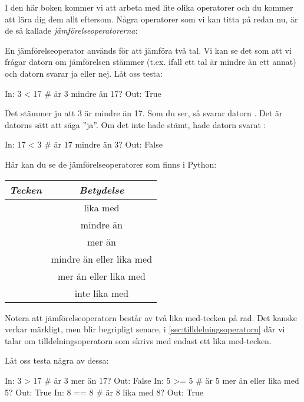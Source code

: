 I den här boken kommer vi att arbeta med lite olika operatorer och du kommer att lära dig dem allt eftersom. Några operatorer som vi kan titta på redan nu, är de så kallade \emph{jämförelseoperatorerna}:

En jämförelseoperator används för att jämföra två tal. Vi kan se det som att vi frågar datorn om jämförelsen stämmer (t.ex. ifall ett tal är mindre än ett annat) och datorn svarar ja eller nej. Låt oss testa:

\begin{python}[caption={Mindre än-operatorn},label={}]
In: 3 < 17 # är 3 mindre än 17?
Out: True
\end{python}

Det stämmer ju att 3 är mindre än 17. Som du ser, så svarar datorn . Det är datorns sätt att säga ''ja''. Om det inte hade stämt, hade datorn svarat :

\begin{python}[caption={Mindre än-operatorn igen},label={}]
In: 17 < 3 # är 17 mindre än 3?
Out: False
\end{python}
\newpage
Här kan du se de jämförelseoperatorer som finns i Python:
\begin{center}
 \label{tab:jamforelseoperatorer}
\begin{tabular}{ l | c }
  \hline
  \emph{Tecken} & \emph{Betydelse} \\
  \hline
  \cw{==} & lika med \\
  \cw{<} & mindre än \\
  \cw{>} & mer än \\
  \cw{<=} & mindre än eller lika med \\
  \cw{>=} & mer än eller lika med \\
  \cw{!=} & inte lika med \\
  \hline
\end{tabular}
\end{center}

Notera att jämförelseoperatorn \cw{==} består av två lika med-tecken på rad. Det kanske verkar märkligt, men blir begripligt senare, i \autoref{sec:tilldelningsoperatorn} där vi talar om tilldelningsoperatorn som skrivs med endast ett lika med-tecken.

Låt oss testa några av dessa:

\begin{python}[caption={Test av jämförelseoperatorer},label={}]
In: 3 > 17 # är 3 mer än 17?
Out: False
In: 5 >= 5 # är 5 mer än eller lika med 5?
Out: True
In: 8 == 8 # är 8 lika med 8?
Out: True
\end{python}

